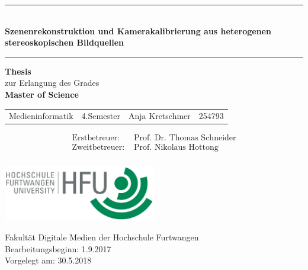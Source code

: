 \begin{titlepage}
\thispagestyle{empty}

\begin{center}
	\enlargethispage{3\baselineskip}
	\hrule
	
	\begin{center} \LARGE \textbf{\\Szenenrekonstruktion und Kamerakalibrierung aus heterogenen stereoskopischen Bildquellen}
	\end{center}
	
	\vspace{0.5cm}
	
	\hrule
	
	\vspace{2.5cm}
	
	{\Large \textbf{Thesis}\\ zur Erlangung des Grades\\[2ex]
	\textbf{Master of Science}}
	
	\vspace{3cm}
	
	\begin{tabular}{l l l l}
		Medieninformatik &4.Semester &Anja Kretschmer &254793 \vspace{0.2cm} \\	
	\end{tabular}
	
	\vspace{1cm}
	
	\begin{align*}
	\text{Erstbetreuer: }  &\text{Prof. Dr. Thomas Schneider}\\
	\text{Zweitbetreuer: }  &\text{Prof. Nikolaus Hottong}\\
	\end{align*}	
	
	\vspace{1.0cm}
	
	
	\vspace{1.5cm}
	\includegraphics[width=0.5\textwidth]{./images/hfu_logo.png}

	Fakultät Digitale Medien der Hochschule Furtwangen\\[1ex]
	Bearbeitungsbeginn: 1.9.2017\\
	Vorgelegt am: 30.5.2018 

\end{center}

\end{titlepage}